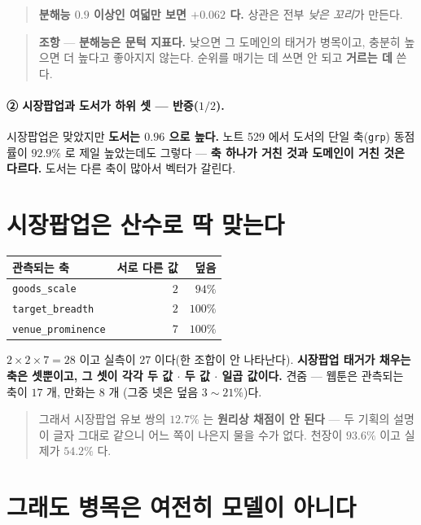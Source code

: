 \documentclass[11pt]{article}
\begin{document}
\begin{quote}
\textbf{분해능 $0.9$ 이상인 여덟만 보면 $\mathbf{+0.062}$ 다.} 상관은 전부
\emph{낮은 꼬리}가 만든다.
\end{quote}

\begin{quote}
\textbf{조항} --- \textbf{분해능은 문턱 지표다.} 낮으면 그 도메인의 태거가
병목이고, 충분히 높으면 더 높다고 좋아지지 않는다. 순위를 매기는 데 쓰면 안
되고 \textbf{거르는 데} 쓴다.
\end{quote}

\paragraph{② 시장팝업과 도서가 하위 셋 --- 반증($1/2$).} 시장팝업은 맞았지만
\textbf{도서는 $0.96$ 으로 높다.} 노트 529 에서 도서의 단일 축(\texttt{grp})
동점률이 $92.9\%$ 로 제일 높았는데도 그렇다 --- \textbf{축 하나가 거친 것과
도메인이 거친 것은 다르다.} 도서는 다른 축이 많아서 벡터가 갈린다.

\section{시장팝업은 산수로 딱 맞는다}

\begin{center}
\begin{tabular}{lrr}
\hline
관측되는 축 & 서로 다른 값 & 덮음 \\
\hline
\texttt{goods\_scale} & $2$ & $94\%$ \\
\texttt{target\_breadth} & $2$ & $100\%$ \\
\texttt{venue\_prominence} & $7$ & $100\%$ \\
\hline
\end{tabular}
\end{center}

$2 \times 2 \times 7 = 28$ 이고 실측이 $27$ 이다(한 조합이 안 나타난다).
\textbf{시장팝업 태거가 채우는 축은 셋뿐이고, 그 셋이 각각 두 값 $\cdot$ 두 값
$\cdot$ 일곱 값이다.} 견줌 --- 웹툰은 관측되는 축이 $17$ 개, 만화는 $8$ 개
(그중 넷은 덮음 $3\!\sim\!21\%$)다.

\begin{quote}
그래서 시장팝업 유보 쌍의 $12.7\%$ 는 \textbf{원리상 채점이 안 된다}
--- 두 기획의 설명이 글자 그대로 같으니 어느 쪽이 나은지 물을 수가 없다.
천장이 $93.6\%$ 이고 실제가 $54.2\%$ 다.
\end{quote}

\section{그래도 병목은 여전히 모델이 아니다}
\end{document}
